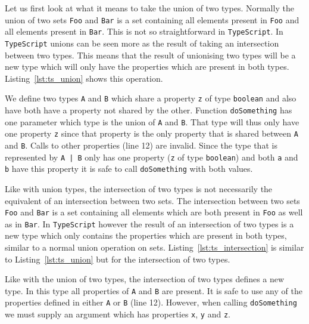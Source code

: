 \documentclass{article}
\newcommand{\ttt}[1]{\texttt{#1}}
\begin{document}
Let us first look at what it means to take the union of two types.
Normally the union of two sets \ttt{Foo} and \ttt{Bar} is a set containing all elements present in \ttt{Foo} and all elements present in \ttt{Bar}.
This is not so straightforward in \ttt{TypeScript}.
In \ttt{TypeScript} unions can be seen more as the result of taking an intersection between two types.
This means that the result of unionising two types will be a new type which will only have the properties which are present in both types.
Listing~\ref{lst:ts_union} shows this operation.
\begin{center}
    \begin{minipage}{.60\textwidth}
    
    \end{minipage}
\end{center}

We define two types \ttt{A} and \ttt{B} which share a property \ttt{z} of type \ttt{boolean} and also have both have a property not shared by the other.
Function \ttt{doSomething} has one parameter which type is the union of \ttt{A} and \ttt{B}.
That type will thus only have one property \ttt{z} since that property is the only property that is shared between \ttt{A} and \ttt{B}.
Calls to other properties (line 12) are invalid.
Since the type that is represented by \ttt{A | B} only has one property (\ttt{z} of type \ttt{boolean}) and both \ttt{a} and \ttt{b} have this property it is safe to call \ttt{doSomething} with both values. 

Like with union types, the intersection of two types is not necessarily the equivalent of an intersection between two sets.
The intersection between two sets \ttt{Foo} and \ttt{Bar} is a set containing all elements which are both present in \ttt{Foo} as well as in \ttt{Bar}.
In \ttt{TypeScript} however the result of an intersection of two types is a new type which only contains the properties which are present in both types, similar to a normal union operation on sets.
Listing~\ref{lst:ts_intersection} is similar to Listing~\ref{lst:ts_union} but for the intersection of two types.

\begin{center}
    \begin{minipage}{.60\textwidth}
    
    \end{minipage}
\end{center}
Like with the union of two types, the intersection of two types defines a new type.
In this type all properties of \ttt{A} and \ttt{B} are present.
It is safe to use any of the properties defined in either \ttt{A} or \ttt{B} (line 12).
However, when calling \ttt{doSomething} we must supply an argument which has properties \ttt{x}, \ttt{y} and \ttt{z}.
\end{document}
